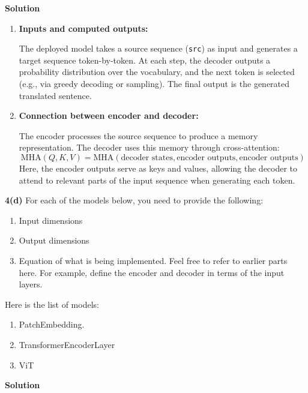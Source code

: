 \documentclass[10pt]{article}
\begin{document}
\textbf{Solution}

\begin{enumerate}[label=\alph*.]

\item \textbf{Inputs and computed outputs:}

The deployed model takes a source sequence (\texttt{src}) as input and generates a target sequence token-by-token. At each step, the decoder outputs a probability distribution over the vocabulary, and the next token is selected (e.g., via greedy decoding or sampling). The final output is the generated translated sentence.

\item \textbf{Connection between encoder and decoder:}

The encoder processes the source sequence to produce a memory representation. The decoder uses this memory through cross-attention:
\[
\mathrm{MHA}(Q,K,V) = \mathrm{MHA}(\text{decoder states}, \text{encoder outputs}, \text{encoder outputs})
\]
Here, the encoder outputs serve as keys and values, allowing the decoder to attend to relevant parts of the input sequence when generating each token.

\end{enumerate}

\textbf{4(d)} For each of the models below, you need to provide the following:

\begin{enumerate}[label=\alph*.]
    \item Input dimensions
    \item Output dimensions
    \item Equation of what is being implemented. Feel free to refer to earlier parts here. For example, define the encoder and decoder in terms of the input layers.
\end{enumerate}

Here is the list of models:
\begin{enumerate}[label=\roman*.]
    \item PatchEmbedding.
    \item TransformerEncoderLayer
    \item ViT
\end{enumerate}

\textbf{Solution}
\end{document}
